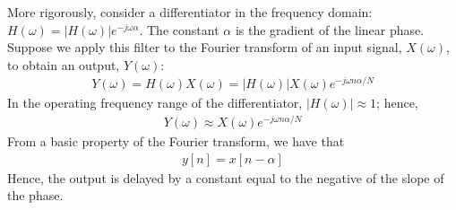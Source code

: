 More rigorously, consider a differentiator in the frequency domain: $H(\omega)=|H(\omega)|e^{-j\omega\alpha}$. The constant $\alpha$ is the gradient of the linear phase. Suppose we apply this filter to the Fourier transform of an input signal, $X(\omega)$, to obtain an output, $Y(\omega)$:
\begin{align}
    Y(\omega) = H(\omega)X(\omega)
              = |H(\omega)|X(\omega)e^{-j\omega n \alpha / N}
\end{align}
In the operating frequency range of the differentiator, $|H(\omega)|\approx 1$; hence,
\begin{align}
    Y(\omega) \approx X(\omega)e^{-j\omega n \alpha / N}
\end{align}
From a basic property of the Fourier transform, we have that
\begin{align}
    y[n] = x[n - \alpha]
\end{align}
Hence, the output is delayed by a constant equal to the negative of the slope of the phase.
